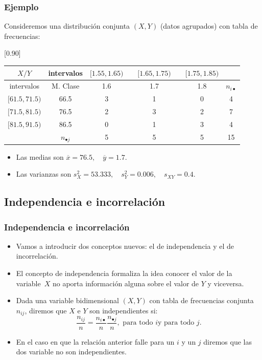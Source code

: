 \begin{frame}
\frametitle{Ejemplo}

Consideremos una distribución conjunta $(X,Y)$ (datos agrupados) con tabla de
frecuencias:

\begin{center}
\scalebox{0.90}[0.90]{
\begin{tabular}{|c|c|ccccc|c|}
\cline{1-7} $X/Y$ & intervalos& \multicolumn{1}{c}{$[1.55,1.65)$} &\vrule &
\multicolumn{1}{c}{$[1.65, 1.75)$} &\vrule &
 \multicolumn{1}{c|}{$[1.75, 1.85)$} &\multicolumn{1}{c}{}\\
\hline intervalos & M. Clase & \multicolumn{1}{c}{1.6} &\vrule & \multicolumn{1}{c}{1.7}
&\vrule & \multicolumn{1}{c|}{1.8} & $n_{i\bullet}$ \\
 \hline
$[61.5, 71.5)$ & 66.5 & 3 && 1 && 0 & 4 \\ $[71.5, 81.5)$ & 76.5 & 2 && 3 && 2 & 7 \\
$[81.5, 91.5)$ & 86.5 & 0 && 1 && 3 & 4 \\ \hline \multicolumn{1}{c|}{} & $n_{\bullet j}$
& 5 && 5 && 5 & 15 \\ \cline{2-8}
\end{tabular}
}
\end{center}
\end{frame}

\begin{frame}
\begin{itemize}
\item Las medias son $\overline{x}=76.5,\quad\overline{y}=1.7$.
\item Las varianzas son $s^2_X=53.333,\quad s^2_Y=0.006,\quad s_{XY}=0.4$.
\end{itemize}
\end{frame}

\subsection{Independencia e incorrelación}

\begin{frame}
\frametitle{Independencia e incorrelación}
\begin{itemize}
\item Vamos a introducir dos conceptos nuevos: el de independencia  y el de incorrelación.
\item El concepto de independencia formaliza la idea conocer el valor de la variable~$X$ no
aporta información alguna sobre el valor de $Y$ y viceversa.

\item Dada una variable bidimensional $(X,Y)$ con tabla de  frecuencias conjunta $n_{ij}$,
diremos que $X$ e $Y$ son independientes  si:
$$
\frac{n_{ij}}{n}=\frac{n_{i\bullet}}{n} \frac{n_{\bullet j}}{n}, \mbox{ para todo } i
\mbox{y para todo } j.
$$
\item 
En el caso en que la relación anterior falle para  un $i$ y un $j$ diremos que las dos
variable no son  independientes.
\end{itemize}
\end {frame}

